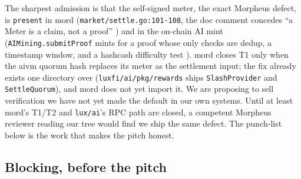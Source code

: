 \documentclass[11pt,a4paper]{article}
\newcommand{\code}[1]{\texttt{\small #1}}
\newcommand{\prov}[1]{{\color{muted}\footnotesize\sffamily[#1]}}
\begin{document}
The sharpest admission is that the self-signed meter, the exact Morpheus defect, is
\code{present} in mord (\code{market/settle.go:101-108}, the doc comment concedes ``a Meter is a
claim, not a proof'' \prov{verified}) and in the on-chain AI mint
(\code{AIMining.submitProof} mints for a proof whose only checks are dedup, a timestamp window,
and a hashcash difficulty test \prov{verified}). mord closes T1 only when the aivm quorum hash
replaces its meter as the settlement input; the fix already exists one directory over
(\code{luxfi/ai/pkg/rewards} ships \code{SlashProvider} and \code{SettleQuorum}), and mord does
not yet import it. We are proposing to sell verification we have not yet made the default in our
own systems. Until at least mord's T1/T2 and \code{lux/ai}'s RPC path are closed, a competent
Morpheus reviewer reading our tree would find we ship the same defect. The punch-list below is
the work that makes the pitch honest.

\subsection{Blocking, before the pitch}
\end{document}
